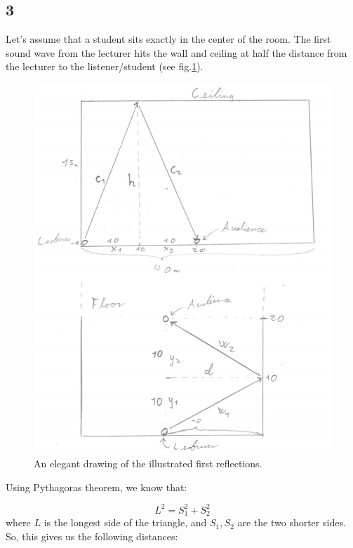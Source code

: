 \documentclass{article}
\begin{document}
\subsection*{3}

Let's assume that a student sits exactly in the center of the room. The first sound wave from the lecturer hits the wall and ceiling at half the distance from the lecturer to the listener/student (see fig.\ref{fig:first_reflections}). 

\begin{figure}[H]
    \centering
    \includegraphics[scale=0.7]{figures/oving1_3.png}
    \caption{An elegant drawing of the illustrated first reflections.}
    \label{fig:first_reflections}
\end{figure}

Using Pythagoras theorem, we know that:

\begin{equation}
    L^2 = S_1^2+S_2^2
\end{equation}
where $L$ is the longest side of the triangle, and $S_1,S_2$ are the two shorter sides.
So, this gives us the following distances:
\end{document}
